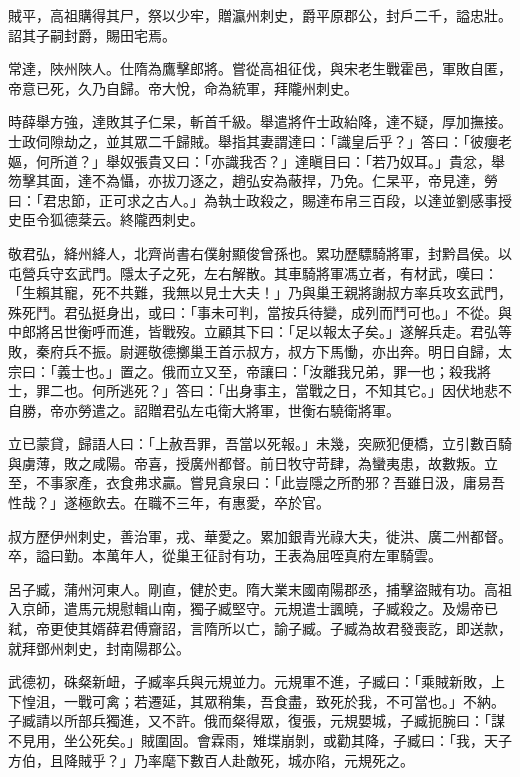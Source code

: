 \begin{pinyinscope}
 賊平，高祖購得其尸，祭以少牢，贈瀛州刺史，爵平原郡公，封戶二千，謚忠壯。詔其子嗣封爵，賜田宅焉。



 常達，陜州陜人。仕隋為鷹擊郎將。嘗從高祖征伐，與宋老生戰霍邑，軍敗自匿，帝意已死，久乃自歸。帝大悅，命為統軍，拜隴州刺史。



 時薛舉方強，達敗其子仁杲，斬首千級。舉遣將仵士政紿降，達不疑，厚加撫接。士政伺隙劫之，並其眾二千歸賊。舉指其妻謂達曰：「識皇后乎？」答曰：「彼癭老嫗，何所道？」舉奴張貴又曰：「亦識我否？」達瞋目曰：「若乃奴耳。」貴忿，舉笏擊其面，達不為懾，亦拔刀逐之，趙弘安為蔽捍，乃免。仁杲平，帝見達，勞曰：「君忠節，正可求之古人。」為執士政殺之，賜達布帛三百段，以達並劉感事授史臣令狐德棻云。終隴西刺史。



 敬君弘，絳州絳人，北齊尚書右僕射顯俊曾孫也。累功歷驃騎將軍，封黔昌侯。以屯營兵守玄武門。隱太子之死，左右解散。其車騎將軍馮立者，有材武，嘆曰：「生賴其寵，死不共難，我無以見士大夫！」乃與巢王親將謝叔方率兵攻玄武門，殊死鬥。君弘挺身出，或曰：「事未可判，當按兵待變，成列而鬥可也。」不從。與中郎將呂世衡呼而進，皆戰歿。立顧其下曰：「足以報太子矣。」遂解兵走。君弘等敗，秦府兵不振。尉遲敬德擲巢王首示叔方，叔方下馬慟，亦出奔。明日自歸，太宗曰：「義士也。」置之。俄而立又至，帝讓曰：「汝離我兄弟，罪一也；殺我將士，罪二也。何所逃死？」答曰：「出身事主，當戰之日，不知其它。」因伏地悲不自勝，帝亦勞遣之。詔贈君弘左屯衛大將軍，世衡右驍衛將軍。



 立已蒙貸，歸語人曰：「上赦吾罪，吾當以死報。」未幾，突厥犯便橋，立引數百騎與虜薄，敗之咸陽。帝喜，授廣州都督。前日牧守苛肆，為蠻夷患，故數叛。立至，不事家產，衣食弗求贏。嘗見貪泉曰：「此豈隱之所酌邪？吾雖日汲，庸易吾性哉？」遂極飲去。在職不三年，有惠愛，卒於官。



 叔方歷伊州刺史，善治軍，戎、華愛之。累加銀青光祿大夫，徙洪、廣二州都督。卒，謚曰勤。本萬年人，從巢王征討有功，王表為屈咥真府左軍騎雲。



 呂子臧，蒲州河東人。剛直，健於吏。隋大業末國南陽郡丞，捕擊盜賊有功。高祖入京師，遣馬元規慰輯山南，獨子臧堅守。元規遣士諷曉，子臧殺之。及煬帝已弒，帝更使其婿薛君傅齎詔，言隋所以亡，諭子臧。子臧為故君發喪訖，即送款，就拜鄧州刺史，封南陽郡公。



 武德初，硃粲新衄，子臧率兵與元規並力。元規軍不進，子臧曰：「乘賊新敗，上下惶沮，一戰可禽；若遷延，其眾稍集，吾食盡，致死於我，不可當也。」不納。子臧請以所部兵獨進，又不許。俄而粲得眾，復張，元規嬰城，子臧扼腕曰：「謀不見用，坐公死矣。」賊圍固。會霖雨，雉堞崩剝，或勸其降，子臧曰：「我，天子方伯，且降賊乎？」乃率麾下數百人赴敵死，城亦陷，元規死之。




\end{pinyinscope}
